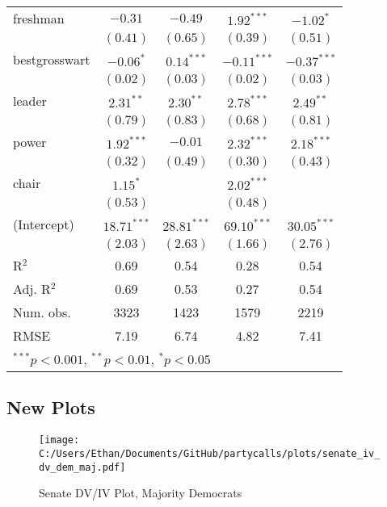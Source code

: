 \documentclass[12pt]{article}
\begin{document}
\begin{table}[H]
\begin{center}
\begin{tabular}{l c c c c }
			freshman               & $-0.31$       & $-0.49$       & $1.92^{***}$  & $-1.02^{*}$   \\
			& $(0.41)$      & $(0.65)$      & $(0.39)$      & $(0.51)$      \\
			bestgrosswart          & $-0.06^{*}$   & $0.14^{***}$  & $-0.11^{***}$ & $-0.37^{***}$ \\
			& $(0.02)$      & $(0.03)$      & $(0.02)$      & $(0.03)$      \\
			leader                 & $2.31^{**}$   & $2.30^{**}$   & $2.78^{***}$  & $2.49^{**}$   \\
			& $(0.79)$      & $(0.83)$      & $(0.68)$      & $(0.81)$      \\
			power                  & $1.92^{***}$  & $-0.01$       & $2.32^{***}$  & $2.18^{***}$  \\
			& $(0.32)$      & $(0.49)$      & $(0.30)$      & $(0.43)$      \\
			chair                  & $1.15^{*}$    &               & $2.02^{***}$  &               \\
			& $(0.53)$      &               & $(0.48)$      &               \\
			(Intercept)            & $18.71^{***}$ & $28.81^{***}$ & $69.10^{***}$ & $30.05^{***}$ \\
			& $(2.03)$      & $(2.63)$      & $(1.66)$      & $(2.76)$      \\
			\hline
			R$^2$                  & 0.69          & 0.54          & 0.28          & 0.54          \\
			Adj. R$^2$             & 0.69          & 0.53          & 0.27          & 0.54          \\
			Num. obs.              & 3323          & 1423          & 1579          & 2219          \\
			RMSE                   & 7.19          & 6.74          & 4.82          & 7.41          \\
			\hline
			\multicolumn{5}{l}{\scriptsize{$^{***}p<0.001$, $^{**}p<0.01$, $^*p<0.05$}}
		\end{tabular}
	\end{center}
\end{table}

\clearpage

\subsection{New Plots}

\begin{figure}[H]
	\centering
	\caption{Senate DV/IV Plot, Majority Democrats}
	\texttt{[image: C:/Users/Ethan/Documents/GitHub/partycalls/plots/senate\_iv\_dv\_dem\_maj.pdf]}
\end{figure}
\end{document}
